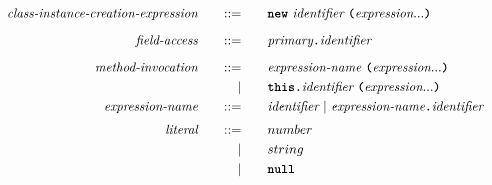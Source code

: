 \begin{alignat*}{9}
&& \textit{class-instance-creation-expression}   && \quad ::= & \quad && \textbf{\texttt{new}} \ \textit{identifier} \ \textbf{\texttt{(}} \textit{expression} ... \textbf{\texttt{)}} && \\[2mm]
&& \textit{field-access}                         && \quad ::= & \quad && \textit{primary} \textbf{\texttt{.}} \textit{identifier} && \\[2mm]
&& \textit{method-invocation}                    && \quad ::= & \quad && \textit{expression-name} \ \textbf{\texttt{(}} \textit{expression} ... \textbf{\texttt{)}} && \\
&&                                               &&         | & \quad && \textbf{\texttt{this}} \textbf{\texttt{.}} \textit{identifier} \ \textbf{\texttt{(}} \textit{expression} ... \textbf{\texttt{)}} && \\
&& \textit{expression-name}                      && \quad ::= & \quad && \textit{identifier} \ | \ \textit{expression-name} \textbf{\texttt{.}} \textit{identifier} && \\[1mm]
&& \textit{literal}                              && \quad ::= & \quad && number && \\
&&                                               &&         | & \quad && string && \\
&&                                               &&         | & \quad && \textbf{\texttt{null}} && \\[2mm]
\end{alignat*}
